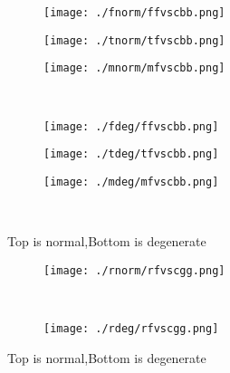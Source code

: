 \documentclass[aps,floats,floatfix,nofootinbib]{revtex4-1}
\begin{document}
\begin{center}
\begin{figure}
\begin{subfigure}{0.3\textwidth}
\texttt{[image: ./fnorm/ffvscbb.png]}
\label{}
\end{subfigure}
\begin{subfigure}{0.3\textwidth}
\texttt{[image: ./tnorm/tfvscbb.png]}
\label{}
\end{subfigure}
\begin{subfigure}{0.3\textwidth}
\texttt{[image: ./mnorm/mfvscbb.png]}
\label{}
\end{subfigure}\\
\begin{subfigure}{0.3\textwidth}
\texttt{[image: ./fdeg/ffvscbb.png]}
\label{}
\end{subfigure}
\begin{subfigure}{0.3\textwidth}
\texttt{[image: ./tdeg/tfvscbb.png]}
\label{}
\end{subfigure}
\begin{subfigure}{0.3\textwidth}
\texttt{[image: ./mdeg/mfvscbb.png]}
\label{}
\end{subfigure}\\
\caption{Top is normal,Bottom is degenerate}
\end{figure}
\end{center}

\begin{center}
\begin{figure}
\begin{subfigure}{0.95\textwidth}
\texttt{[image: ./rnorm/rfvscgg.png]}
\label{}
\end{subfigure}\\
\begin{subfigure}{0.95\textwidth}
\texttt{[image: ./rdeg/rfvscgg.png]}
\label{}
\end{subfigure}
\caption{Top is normal,Bottom is degenerate}
\end{figure}
\end{center}
\end{document}
